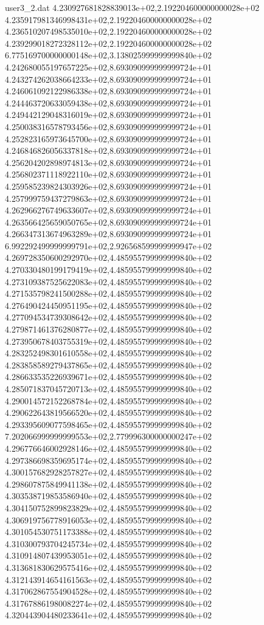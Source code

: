 \begin{filecontents}{user3_2.dat}
4.230927681828839013e+02,2.192204600000000028e+02
4.235917981346998431e+02,2.192204600000000028e+02
4.236510207498535010e+02,2.192204600000000028e+02
4.239299018272328112e+02,2.192204600000000028e+02
6.775169700000000148e+02,3.138025999999999840e+02
4.242680055197657225e+02,8.693090999999999724e+01
4.243274262038664233e+02,8.693090999999999724e+01
4.246061092122986338e+02,8.693090999999999724e+01
4.244463720633059438e+02,8.693090999999999724e+01
4.249442129048316019e+02,8.693090999999999724e+01
4.250038316578793456e+02,8.693090999999999724e+01
4.252823165973645700e+02,8.693090999999999724e+01
4.246846826056337818e+02,8.693090999999999724e+01
4.256204202898974813e+02,8.693090999999999724e+01
4.256802371118922110e+02,8.693090999999999724e+01
4.259585239824303926e+02,8.693090999999999724e+01
4.257999759437279863e+02,8.693090999999999724e+01
4.262966276749633607e+02,8.693090999999999724e+01
4.263566425659050765e+02,8.693090999999999724e+01
4.266347313674963289e+02,8.693090999999999724e+01
6.992292499999999791e+02,2.926568599999999947e+02
4.269728350600292970e+02,4.485955799999999840e+02
4.270330480199179419e+02,4.485955799999999840e+02
4.273109387525622083e+02,4.485955799999999840e+02
4.271535798241500288e+02,4.485955799999999840e+02
4.276490424450951195e+02,4.485955799999999840e+02
4.277094534739308642e+02,4.485955799999999840e+02
4.279871461376280877e+02,4.485955799999999840e+02
4.273950678403755319e+02,4.485955799999999840e+02
4.283252498301610558e+02,4.485955799999999840e+02
4.283858589279437865e+02,4.485955799999999840e+02
4.286633535226939671e+02,4.485955799999999840e+02
4.285071837045720713e+02,4.485955799999999840e+02
4.290014572152268784e+02,4.485955799999999840e+02
4.290622643819566520e+02,4.485955799999999840e+02
4.293395609077598465e+02,4.485955799999999840e+02
7.202066999999999553e+02,2.779996300000000247e+02
4.296776646002928146e+02,4.485955799999999840e+02
4.297386698359695174e+02,4.485955799999999840e+02
4.300157682928257827e+02,4.485955799999999840e+02
4.298607875849941138e+02,4.485955799999999840e+02
4.303538719853586940e+02,4.485955799999999840e+02
4.304150752899823829e+02,4.485955799999999840e+02
4.306919756778916053e+02,4.485955799999999840e+02
4.301054530751173388e+02,4.485955799999999840e+02
4.310300793704245734e+02,4.485955799999999840e+02
4.310914807439953051e+02,4.485955799999999840e+02
4.313681830629575416e+02,4.485955799999999840e+02
4.312143914654161563e+02,4.485955799999999840e+02
4.317062867554904528e+02,4.485955799999999840e+02
4.317678861980082274e+02,4.485955799999999840e+02
4.320443904480233641e+02,4.485955799999999840e+02

\end{filecontents}
